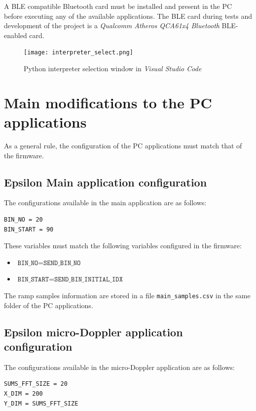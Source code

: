 A BLE compatible Bluetooth card must be installed and present in the PC before executing any of the available applications. The BLE card during tests and development of the project is a \textit{Qualcomm Atheros QCA61x4 Bluetooth} BLE-enabled card.

\begin{figure}[ht]
	\centering
	\texttt{[image: interpreter\_select.png]}
	\caption{Python interpreter selection window in \textit{Visual Studio Code} \label{fig:interpreter_select}}
\end{figure}

\section{Main modifications to the PC applications}

As a general rule, the configuration of the PC applications must match that of the firmware.

\subsection{Epsilon Main application configuration}

The configurations available in the main application are as follows:

\begin{verbatim}
BIN_NO = 20
BIN_START = 90
\end{verbatim}

These variables must match the following variables configured in the firmware:
\begin{itemize}
	\item $\texttt{BIN\_NO} = \texttt{SEND\_BIN\_NO}$
	\item $\texttt{BIN\_START} = \texttt{SEND\_BIN\_INITIAL\_IDX}$
\end{itemize}

The ramp samples information are stored in a file \texttt{main\_samples.csv} in the same folder of the PC applications.

\subsection{Epsilon micro-Doppler application configuration}

The configurations available in the micro-Doppler application are as follows:

\begin{verbatim}
SUMS_FFT_SIZE = 20
X_DIM = 200
Y_DIM = SUMS_FFT_SIZE
\end{verbatim}


